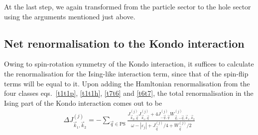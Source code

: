 \documentclass{revtex4-2}
\begin{document}
At the last step, we again transformed from the particle sector to the hole sector using the arguments mentioned just above.

\subsection{Net renormalisation to the Kondo interaction}
Owing to spin-rotation symmetry of the Kondo interaction, it suffices to calculate the renormalisation for the Ising-like interaction term, since that of the spin-flip terms will be equal to it. Upon adding the Hamltonian renormalisation from the four classes eqs.~\ref{t1t1p}, \ref{t1t1h}, \ref{t7t6} and \ref{t6t7}, the total renormalisation in the Ising part of the Kondo interaction comes out to be
\begin{equation}\begin{aligned}
	\Delta J^{(j)}_{\vec k_1, \vec k_2} = -\sum_{\vec q \in \text{PS}} \frac{J^{(j)}_{\vec k_2,\vec q} J^{(j)}_{\vec k_1,\vec q} + 4J^{(j)}_{-\vec q,\vec q} W^{(j)}_{\vec q,-\vec q,\vec k_1, \vec k_2}}{\omega - |\varepsilon_j| + J^{(j)}_{\vec q}/4 + W^{(j)}_{\vec q}/2}
\end{aligned}\end{equation}
\end{document}
